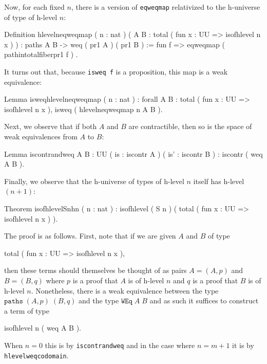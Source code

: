 Now, for each fixed $n$, there is a version of \verb|eqweqmap|
relativized to the h-universe of type of h-level $n$:
\begin{center}
  \begin{coqcode}
Definition hlevelneqweqmap ( n : nat ) 
( A B : total ( fun x : UU => isofhlevel n x ) ) 
: paths A B -> weq ( pr1 A ) ( pr1 B ) := 
fun f => eqweqmap ( pathintotalfiberpr1 f ) .
  \end{coqcode}
\end{center}
It turns out that, because \verb|isweq f| is a proposition, this
map is a weak equivalence:
\begin{center}
  \begin{coqcode}
Lemma isweqhlevelneqweqmap ( n : nat ) : 
forall A B : total ( fun x : UU => isofhlevel n x ), 
isweq ( hlevelneqweqmap n A B ).
  \end{coqcode}
\end{center}
Next, we observe that if both $A$ and $B$ are contractible, then so is
the space of weak equivalences from $A$ to $B$:
\begin{center}
\begin{coqcode}
Lemma iscontrandweq { A B : UU } ( is : iscontr A ) 
 ( is' : iscontr B ) : iscontr ( weq A B ).
\end{coqcode}
\end{center}
Finally, we observe that the h-universe of types of h-level $n$ itself
has h-level $(n+1)$:
\begin{center}
  \begin{coqcode}
Theorem isofhlevelSnhn ( n : nat ) : isofhlevel ( S n ) 
( total ( fun x : UU => isofhlevel n x ) ).
  \end{coqcode}
\end{center}
The proof is as follows.  First, note that if we are given $A$ and $B$
of type 
\begin{center}
  \begin{coqcode}
total ( fun x : UU => isofhlevel n x ),
  \end{coqcode}
\end{center}
then these terms should themselves be thought of as pairs $A=(A,p)$ and
$B=(B,q)$ where $p$ is a proof that $A$ is of h-level $n$ and $q$ is a
proof that $B$ is of h-level $n$.  Nonetheless, there is a weak
equivalence between the type $\texttt{paths}\;(A,p)\;(B,q)$ and the
type $\texttt{WEq}\;A\;B$ and as such it suffices to construct a
term of type
\begin{center}
  \begin{coqcode}
isofhlevel n ( weq A B ).
  \end{coqcode}
\end{center}
When $n=0$ this is by \verb|iscontrandweq| and in the case where
$n=m+1$ it is by \verb|hlevelweqcodomain|.